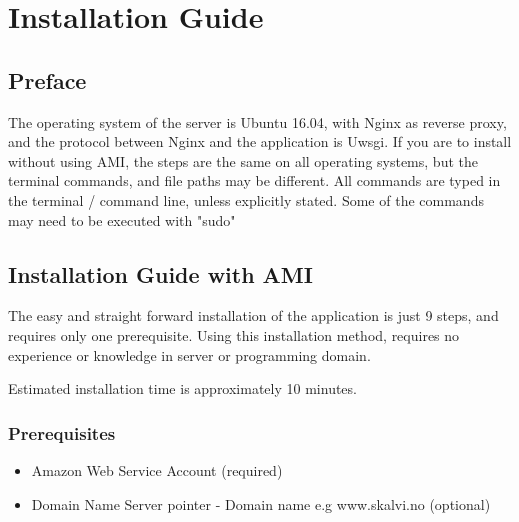 


\chapter{Installation Guide}

\section{Preface}
The operating system of the server is Ubuntu 16.04, with Nginx as reverse proxy, and the protocol between Nginx and the application is Uwsgi. If you are to install without using AMI, the steps are the same on all operating systems, but the terminal commands, and file paths may be different.
All commands are typed in the terminal / command line, unless explicitly stated. Some of the commands may need to be executed with "sudo"

\section{Installation Guide with AMI}
The easy and straight forward installation of the application is just 9 steps, and requires only one prerequisite. Using this installation method, requires no experience or knowledge in server or programming domain. 

Estimated installation time is approximately 10 minutes.

\subsection{Prerequisites}
\begin{itemize}  
\item Amazon Web Service Account (required)
\item Domain Name Server pointer - Domain name e.g www.skalvi.no (optional)
\end{itemize}

